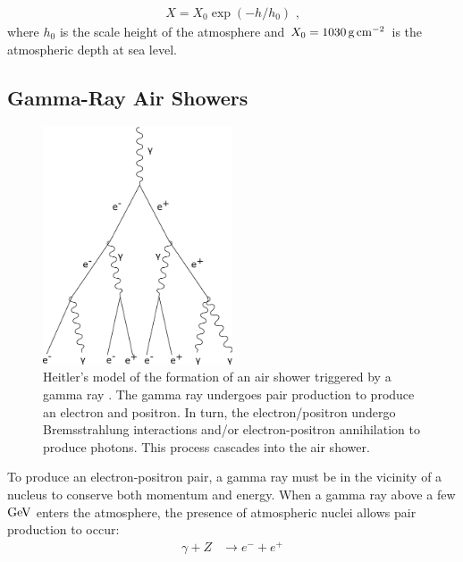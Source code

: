 \begin{equation}
    \begin{aligned}
    X=X_0\exp(-h/h_0)\text{ ,}
    \end{aligned}
\end{equation}
where $h_0$ is the scale height of the atmosphere and $X_0=1030\,\si{\gram\per\centi\meter\squared}$ is the atmospheric depth at sea level. 

\subsection{Gamma-Ray Air Showers} \label{sec:05_air_shower_gamma_ray}
\begin{figure}
    \includegraphics[width=0.5\textwidth]{05_Astronomy/Images/air_shower/gamma_ray.pdf}
    \caption{Heitler's model of the formation of an air shower triggered by a gamma ray \citep{1954qtr..book.....H}. The gamma ray undergoes pair production to produce an electron and positron. In turn, the electron/positron undergo Bremsstrahlung interactions and/or electron-positron annihilation to produce photons. This process cascades into the air shower.}
    \label{fig:chapter_2_air_shower_em}
\end{figure}
To produce an electron-positron pair, a gamma ray must be in the vicinity of a nucleus to conserve both momentum and energy. When a gamma ray above a few $\si{\giga\electronvolt}$ enters the atmosphere, the presence of atmospheric nuclei allows pair production to occur:
\begin{equation}
    \begin{aligned}
    \gamma + Z &\rightarrow e^- + e^+
    \end{aligned}
\end{equation}
